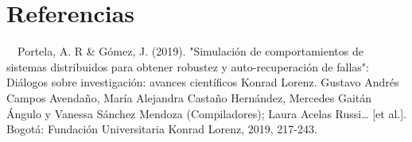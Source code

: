 \documentclass[11pt]{article}
\begin{document}
\section{Referencias}
\label{sec-1}
\ \ Portela, A. R \& Gómez, J. (2019). "Simulación de comportamientos de sistemas distribuidos para obtener robustez y auto-recuperación de fallas": Diálogos sobre investigación: avances científicos Konrad Lorenz. Gustavo Andrés Campos Avendaño, María  Alejandra Castaño Hernández, Mercedes Gaitán Ángulo y Vanessa Sánchez Mendoza (Compiladores); Laura Acelas Russi\ldots{} [et al.]. Bogotá: Fundación Universitaria Konrad Lorenz, 2019, 217-243. 
\end{document}
